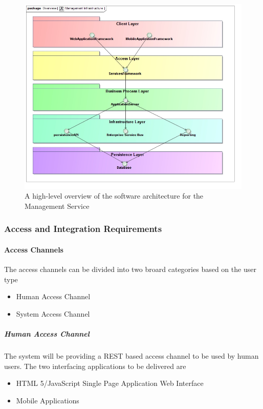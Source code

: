 \begin{figure}[H]
  \begin{center}
  \includegraphics[scale=0.4]{../Diagrams and Charts/Overview/ManagementInfrastructure.jpg}
  \caption{A high-level overview of the software architecture for the Management Service}
  \label{fig:managementInfrastructure}
  \end{center}
\end{figure}


\subsubsection{Access and Integration Requirements}
\label{sec:accessIntegrationRequirementsManagementSystem}
\paragraph{Access Channels}
The access channels can be divided into two broard categories based on the user type
\begin{itemize}
	\item Human Access Channel
	\item System Access Channel
\end{itemize}

\subparagraph{Human Access Channel}
\label{sec:humanAccessChannelManagementSystem}
The system will be providing a REST based access channel to be used by human
users. The two interfacing applications to be delivered are
\begin{itemize}
	\item HTML 5/JavaScript Single Page Application Web Interface
	\item Mobile Applications
\end{itemize}

